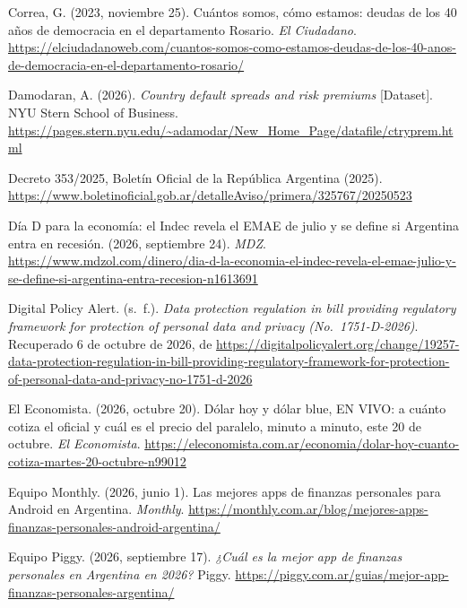 \begin{CSLReferences}{1}{0}
Correa, G. (2023, noviembre 25). Cuántos somos, cómo estamos: deudas de
los 40 años de democracia en el departamento Rosario. \emph{El
Ciudadano}.
\url{https://elciudadanoweb.com/cuantos-somos-como-estamos-deudas-de-los-40-anos-de-democracia-en-el-departamento-rosario/}

Damodaran, A. (2026). \emph{Country default spreads and risk premiums}
{[}Dataset{]}. NYU Stern School of Business.
\url{https://pages.stern.nyu.edu/~adamodar/New_Home_Page/datafile/ctryprem.html}

Decreto 353/2025, Boletín Oficial de la República Argentina (2025).
\url{https://www.boletinoficial.gob.ar/detalleAviso/primera/325767/20250523}

Día D para la economía: el Indec revela el EMAE de julio y se define si
Argentina entra en recesión. (2026, septiembre 24). \emph{MDZ}.
\url{https://www.mdzol.com/dinero/dia-d-la-economia-el-indec-revela-el-emae-julio-y-se-define-si-argentina-entra-recesion-n1613691}

Digital Policy Alert. (s.~f.). \emph{Data protection regulation in bill
providing regulatory framework for protection of personal data and
privacy (No.~1751-D-2026)}. Recuperado 6 de octubre de 2026, de
\url{https://digitalpolicyalert.org/change/19257-data-protection-regulation-in-bill-providing-regulatory-framework-for-protection-of-personal-data-and-privacy-no-1751-d-2026}

El Economista. (2026, octubre 20). Dólar hoy y dólar blue, EN VIVO: a
cuánto cotiza el oficial y cuál es el precio del paralelo, minuto a
minuto, este 20 de octubre. \emph{El Economista}.
\url{https://eleconomista.com.ar/economia/dolar-hoy-cuanto-cotiza-martes-20-octubre-n99012}

Equipo Monthly. (2026, junio 1). Las mejores apps de finanzas personales
para Android en Argentina. \emph{Monthly}.
\url{https://monthly.com.ar/blog/mejores-apps-finanzas-personales-android-argentina/}

Equipo Piggy. (2026, septiembre 17). \emph{¿Cuál es la mejor app de
finanzas personales en Argentina en 2026?} Piggy.
\url{https://piggy.com.ar/guias/mejor-app-finanzas-personales-argentina/}


\end{CSLReferences}
